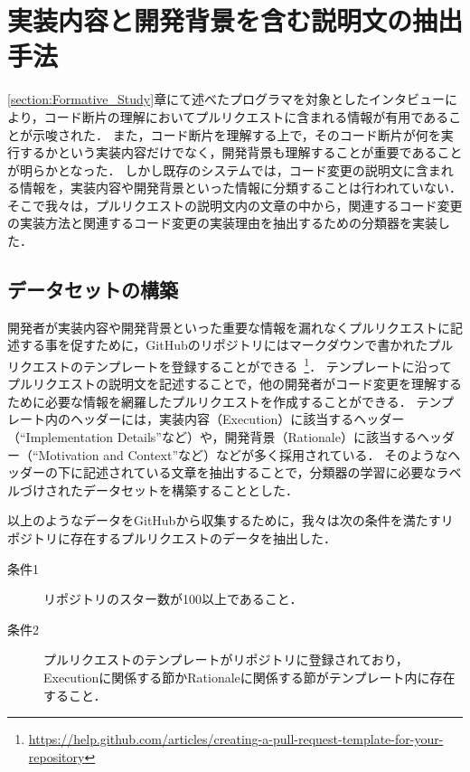 \section{実装内容と開発背景を含む説明文の抽出手法}


\ref{section:Formative_Study}章にて述べたプログラマを対象としたインタビューにより，コード断片の理解においてプルリクエストに含まれる情報が有用であることが示唆された．
また，コード断片を理解する上で，そのコード断片が何を実行するかという実装内容だけでなく，開発背景も理解することが重要であることが明らかとなった．
しかし既存のシステムでは，コード変更の説明文に含まれる情報を，実装内容や開発背景といった情報に分類することは行われていない．
そこで我々は，プルリクエストの説明文内の文章の中から，関連するコード変更の実装方法と関連するコード変更の実装理由を抽出するための分類器を実装した．


\subsection{データセットの構築}


開発者が実装内容や開発背景といった重要な情報を漏れなくプルリクエストに記述する事を促すために，GitHubのリポジトリにはマークダウンで書かれたプルリクエストのテンプレートを登録することができる~\footnote{\url{https://help.github.com/articles/creating-a-pull-request-template-for-your-repository}}．
テンプレートに沿ってプルリクエストの説明文を記述することで，他の開発者がコード変更を理解するために必要な情報を網羅したプルリクエストを作成することができる．
テンプレート内のヘッダーには，実装内容（Execution）に該当するヘッダー（``Implementation Details''など）や，開発背景（Rationale）に該当するヘッダー（``Motivation and Context''など）などが多く採用されている．
そのようなヘッダーの下に記述されている文章を抽出することで，分類器の学習に必要なラベルづけされたデータセットを構築することとした．

以上のようなデータをGitHubから収集するために，我々は次の条件を満たすリポジトリに存在するプルリクエストのデータを抽出した．

\begin{description}
\item[条件1] リポジトリのスター数が100以上であること．
\item[条件2] プルリクエストのテンプレートがリポジトリに登録されており， Executionに関係する節かRationaleに関係する節がテンプレート内に存在すること．
\end{description}

